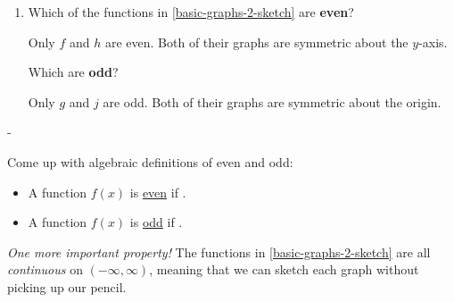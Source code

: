 \documentclass{article}
\makeatletter
\newlength{\tipmargin}
\renewenvironment{framed}{
  \setlength{\tipmargin}{\textwidth-\linewidth}
  \advance\@totalleftmargin-\tipmargin
  \def\FrameCommand{\hspace{\tipmargin}\fbox}%
  \advance\linewidth\tipmargin
  \MakeFramed {\advance\hsize-\width \FrameRestore}%
}
{\endMakeFramed}
\makeatother
\begin{document}
\begin{enumerate}
  \begin{enumerate}[resume]
  \item 

    \begin{problem}[\vfill]
      Which of the functions in
      \ref{basic-graphs-2-sketch} are \textbf{even}?  
    \end{problem}

   \begin{solution}
      Only $f$ and $h$ are even. Both of their graphs are symmetric about the $y$-axis.
   \end{solution} 

    \begin{problem}[\vfill]
      Which are \textbf{odd}?
    \end{problem}

    \begin{solution}
      Only $g$ and $j$ are odd. Both of their graphs are symmetric about the origin.
    \end{solution}
  \end{enumerate}

\end{enumerate}
\begin{framed}
  Come up with algebraic definitions of even and odd:

  \begin{itemize}
  \item A function $f(x)$ is \uline{even} if .
  \item A function $f(x)$ is \uline{odd} if .
  \end{itemize}

  \emph{One more important property!} The functions in \ref{basic-graphs-2-sketch} are all \emph{continuous} on $(-\infty, \infty)$, meaning that we can sketch each graph without picking up our pencil.
\end{framed}

\pspace{\newpage}
\end{document}
